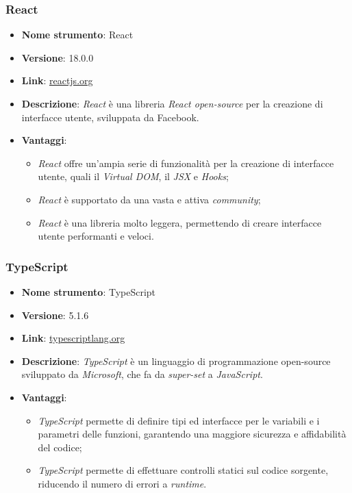 \subsubsection{React}
\begin{itemize}
    \item \textbf{Nome strumento}: React
    \item \textbf{Versione}: 18.0.0
    \item \textbf{Link}: \href{https://reactjs.org/}{reactjs.org}
    \item \textbf{Descrizione}: \textit{React} è una libreria \textit{React open-source} per la creazione di interfacce utente, sviluppata da Facebook.
    \item \textbf{Vantaggi}:
          \begin{itemize}
              \item \textit{React} offre un'ampia serie di funzionalità per la creazione di interfacce utente, quali il \textit{Virtual DOM}, il \textit{JSX} e \textit{Hooks};
              \item \textit{React} è supportato da una vasta e attiva \textit{community};
              \item \textit{React} è una libreria molto leggera, permettendo di creare interfacce utente performanti e veloci.
          \end{itemize}
\end{itemize}

\subsubsection{TypeScript}
\begin{itemize}
    \item \textbf{Nome strumento}: TypeScript
    \item \textbf{Versione}: 5.1.6
    \item \textbf{Link}: \href{https://www.typescriptlang.org/}{typescriptlang.org}
    \item \textbf{Descrizione}: \textit{TypeScript} è un linguaggio di programmazione open-source sviluppato da \textit{Microsoft}, che fa da \textit{\gls{super-set}\glox} a \textit{JavaScript}.
    \item \textbf{Vantaggi}:
          \begin{itemize}
              \item \textit{TypeScript} permette di definire tipi ed interfacce per le variabili e i parametri delle funzioni, garantendo una maggiore sicurezza e affidabilità del codice;
              \item \textit{TypeScript} permette di effettuare controlli statici sul codice sorgente, riducendo il numero di errori a \textit{runtime}.
          \end{itemize}
\end{itemize}

